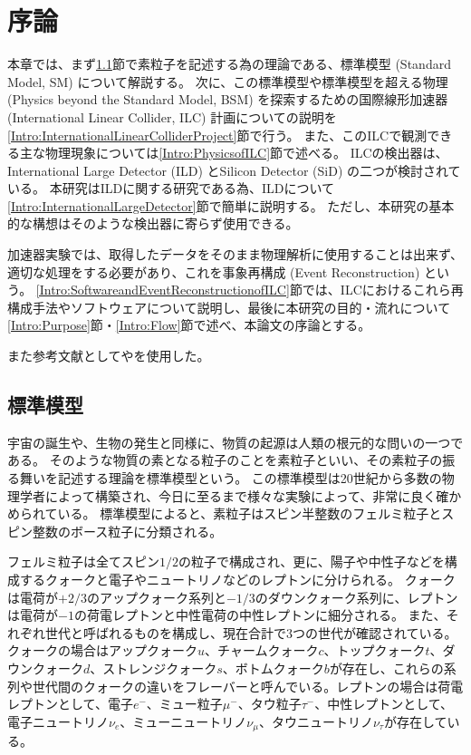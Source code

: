 
\chapter{序論} \label{chap:Introduction}

本章では、まず\ref{Intro:StandardModel}節で素粒子を記述する為の理論である、標準模型 (Standard Model, SM) について解説する。
次に、この標準模型や標準模型を超える物理 (Physics beyond the Standard Model, BSM) を探索するための国際線形加速器 (International Linear Collider, ILC) 計画についての説明を\ref{Intro:InternationalLinearColliderProject}節で行う。
また、このILCで観測できる主な物理現象については\ref{Intro:PhysicsofILC}節で述べる。
ILCの検出器は、International Large Detector (ILD) とSilicon Detector (SiD) の二つが検討されている。
本研究はILDに関する研究である為、ILDについて\ref{Intro:InternationalLargeDetector}節で簡単に説明する。
ただし、本研究の基本的な構想はそのような検出器に寄らず使用できる。

加速器実験では、取得したデータをそのまま物理解析に使用することは出来ず、適切な処理をする必要があり、これを事象再構成 (Event Reconstruction) という。
\ref{Intro:SoftwareandEventReconstructionofILC}節では、ILCにおけるこれら再構成手法やソフトウェアについて説明し、最後に本研究の目的・流れについて\ref{Intro:Purpose}節・\ref{Intro:Flow}節で述べ、本論文の序論とする。

また参考文献として\cite{GlobalProject}や\cite{InterimDesignReport}を使用した。

\section{標準模型} \label{Intro:StandardModel}

宇宙の誕生や、生物の発生と同様に、物質の起源は人類の根元的な問いの一つである。
そのような物質の素となる粒子のことを素粒子といい、その素粒子の振る舞いを記述する理論を標準模型という。
この標準模型は20世紀から多数の物理学者によって構築され、今日に至るまで様々な実験によって、非常に良く確かめられている。
標準模型によると、素粒子はスピン半整数のフェルミ粒子とスピン整数のボース粒子に分類される。

フェルミ粒子は全てスピン$1/2$の粒子で構成され、更に、陽子や中性子などを構成するクォークと電子やニュートリノなどのレプトンに分けられる。
クォークは電荷が$+2/3$のアップクォーク系列と$-1/3$のダウンクォーク系列に、レプトンは電荷が$-1$の荷電レプトンと中性電荷の中性レプトンに細分される。
また、それぞれ世代と呼ばれるものを構成し、現在合計で3つの世代が確認されている。
クォークの場合はアップクォーク$u$、チャームクォーク$c$、トップクォーク$t$、ダウンクォーク$d$、ストレンジクォーク$s$、ボトムクォーク$b$が存在し、これらの系列や世代間のクォークの違いをフレーバーと呼んでいる。レプトンの場合は荷電レプトンとして、電子$e^-$、ミュー粒子$\mu^-$、タウ粒子$\tau^-$、中性レプトンとして、電子ニュートリノ$\nu_e$、ミューニュートリノ$\nu_{\mu}$、タウニュートリノ$\nu_{\tau}$が存在している。

